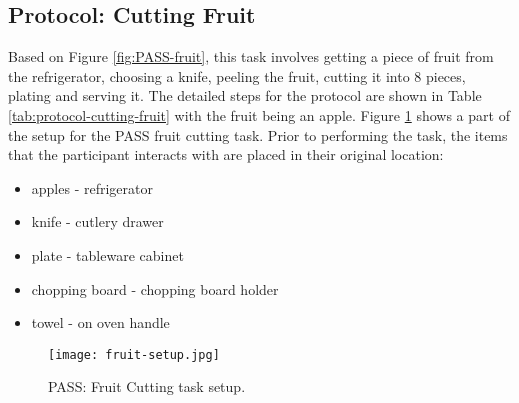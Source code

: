 \subsection{Protocol: Cutting Fruit}
Based on Figure \ref{fig:PASS-fruit}, this task involves getting a piece of fruit from the refrigerator, choosing a knife, peeling the fruit, cutting it into 8 pieces, plating and serving it. The detailed steps for the protocol are shown in Table \ref{tab:protocol-cutting-fruit} with the fruit being an apple. Figure \ref{fig:PASS-fruit-setup} shows a part of the setup for the PASS fruit cutting task. Prior to performing the task, the items that the participant interacts with are placed in their original location:

\begin{itemize}
    \item apples - refrigerator
    \item knife - cutlery drawer
    \item plate - tableware cabinet
    \item chopping board - chopping board holder
    \item towel - on oven handle
\end{itemize}

\begin{figure}[ht]
    \centering
    \texttt{[image: fruit-setup.jpg]}
    \caption{PASS: Fruit Cutting task setup.}
    \label{fig:PASS-fruit-setup}
\end{figure}


